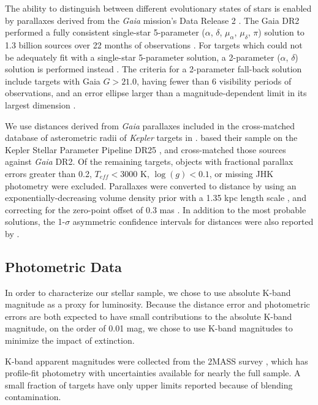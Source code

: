 \documentclass[manuscript]{aastex6}
\newcommand{\Kepler}{\mbox{\textit{Kepler}}}
\newcommand{\Gaia}{\mbox{\textit{Gaia}}}
\newcommand{\Teff}{\ensuremath{T_{eff}}}
\newcommand{\logg}{\ensuremath{\log(g)}}
\begin{document}
The ability to distinguish between different evolutionary states of stars is
enabled by parallaxes derived from the \Gaia{} mission's Data Release 2
\citep{Gaia18}. The Gaia DR2 performed a fully consistent single-star
5-parameter (\(\alpha\), \(\delta\), \(\mu_\alpha\), \(\mu_\delta\), \(\pi\))
solution to 1.3 billion sources over 22 months of observations
\citep{Lindegren18}. For targets which could not be adequately fit with a
single-star 5-parameter solution, a 2-parameter (\(\alpha\), \(\delta\))
solution is performed instead \citep{Michalik15}. The criteria for a
2-parameter fall-back solution include targets with Gaia \(G > 21.0\), having
fewer than 6 visibility periods of observations, and an error ellipse larger
than a magnitude-dependent limit in its largest dimension \citep{Lindegren18}.

We use distances derived from \Gaia{} parallaxes included in the cross-matched
database of asterometric radii of \Kepler{} targets in \citet{Berger18}.
\citet{Berger18} based their sample on the Kepler Stellar Parameter Pipeline
DR25 \citep{Mathur17}, and cross-matched those sources against \Gaia{} DR2. Of
the remaining targets, objects with fractional parallax errors greater than
0.2, \(\Teff < 3000\) K, \(\logg < 0.1\), or missing JHK photometry were
excluded. Parallaxes were converted to distance by using an
exponentially-decreasing volume density prior with a 1.35 kpc length scale
\citep{BailerJones15,Astraatmadja16}, and correcting for the zero-point offset
of 0.3 mas \citep{Lindegren18}. In addition to the most probable solutions, the
1-\(\sigma\) asymmetric confidence intervals for distances were also reported
by \citet{Berger18}.

\subsection{Photometric Data}

In order to characterize our stellar sample, we chose to use absolute K-band
magnitude as a proxy for luminosity. Because the distance error and photometric
errors are both expected to have small contributions to the absolute K-band
magnitude, on the order of 0.01 mag, we chose to use K-band magnitudes to
minimize the impact of extinction.

K-band apparent magnitudes were collected from the 2MASS survey 
\citep{Skrutskie06}, which has profile-fit photometry with uncertainties 
available for nearly the full sample. A small fraction of targets have only 
upper limits reported because of blending contamination.
\end{document}
